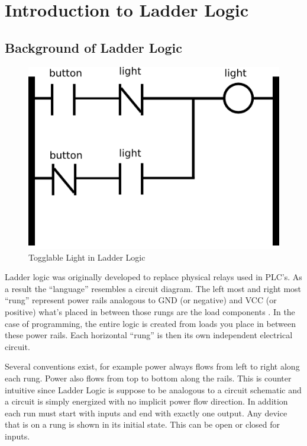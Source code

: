 \chapter{Introduction to Ladder Logic}
\section{Background of Ladder Logic}
\label{section:ladderlogic}

\begin{figure}[htp]
    \centering
    \includegraphics[width=\imgsmlphoto]{./images/lltoggle_light.png}
    \caption{Togglable Light in Ladder Logic}
    \label{fig:lltoggle_light}
\end{figure}

Ladder logic was originally developed to replace physical relays used in PLC's.
As a result the ``language'' resembles a circuit diagram. The left most
and right most ``rung'' represent power rails analogous to GND (or negative)
 and VCC (or positive) what's
placed in between those rungs are the load components \cite{ebookmorris}. In 
the case of programming, the entire logic is created from loads you place 
in between these power rails. Each horizontal ``rung'' is then its own
independent electrical circuit.

Several conventions exist, for example power always flows from left 
to right along each rung. Power also flows from top to bottom along the 
rails. This is counter intuitive since Ladder Logic is suppose to be 
analogous to a circuit schematic and a circuit is simply energized
with no implicit power flow direction. In addition each run must 
start with inputs and end
with exactly one output. Any device that is on a rung is shown in its
initial state. This can be open or closed for inputs.

